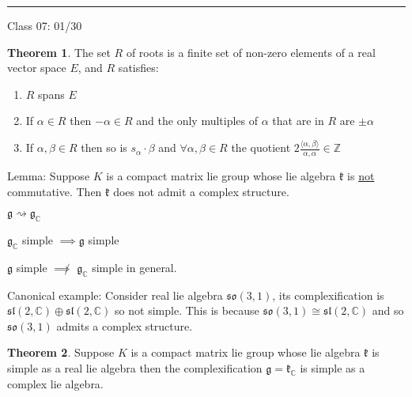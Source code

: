 \documentclass{article}
\theoremstyle{definition}
\newtheorem{theorem}{Theorem}
\begin{document}
\hfil
\hrule

Class 07: 01/30

\begin{theorem}
    The set \(R\) of roots is a finite set of non-zero elements of a real vector space \(E\), and \(R\) satisfies:

    \begin{enumerate}
        \item \(R\) spans \(E\) 
        \item If \(\alpha \in R\) then \(-\alpha \in R\) and the only multiples of \(\alpha \) that are in \(R\) are \(\pm \alpha \) 
        \item If \(\alpha ,\beta \in R\) then so is \(s_\alpha \cdot \beta \) and \(\forall \alpha ,\beta \in R\) the quotient \(2\frac{\langle \alpha ,\beta  \rangle }{\alpha ,\alpha }\in \mathbb{Z}\) 
    \end{enumerate}

\end{theorem}

Lemma: Suppose \(K\) is a compact matrix lie group whose lie algebra \(\mathfrak{k} \) is \underline{not} commutative. Then \(\mathfrak{k} \) does not admit a complex structure.

\(\mathfrak{g}\rightsquigarrow \mathfrak{g}_\mathbb{C}  \)

\(\mathfrak{g}_\mathbb{C} \) simple \(\implies \mathfrak{g} \) simple

\(\mathfrak{g} \) simple \(\not\implies \) \(\mathfrak{g} _\mathbb{C} \) simple in general.

Canonical example: Consider real lie algebra \(\mathfrak{so}(3,1)\), its complexification is \(\mathfrak{sl}(2,\mathbb{C})\oplus \mathfrak{sl}(2,\mathbb{C})  \) so not simple. This is because \(\mathfrak{so}(3,1)\cong \mathfrak{sl}(2,\mathbb{C})  \) and so \(\mathfrak{so}(3,1) \) admits a complex structure. 

\begin{theorem}
    Suppose \(K\) is a compact matrix lie group whose lie algebra \(\mathfrak{k} \) is simple as a real lie algebra then the complexification \(\mathfrak{g}=\mathfrak{k}_\mathbb{C}  \) is simple as a complex lie algebra. 
\end{theorem}
\end{document}
